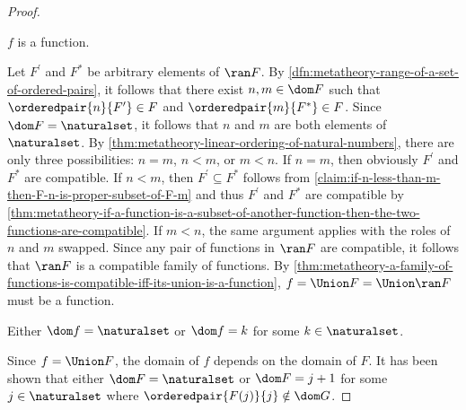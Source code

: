 \begin{proof}
    \begin{claim}
         \label{claim:f-is-a-function}
        \( f \) is a function.
    \end{claim}
    \noindent
    Let \( F^{\prime} \) and \( F^{\ast} \) be arbitrary elements of \( \ran F \).
    By \cref{dfn:metatheory-range-of-a-set-of-ordered-pairs}, it follows that there exist \( n, m \in \dom F\)
    such that \( \orderedpair{n}{F^{\prime}} \in F \) and \( \orderedpair{m}{F^{\ast}} \in F \).
    Since \( \dom F = \naturalset \), it follows that \( n \) and \( m \) are both elements of \( \naturalset \).
    By \cref{thm:metatheory-linear-ordering-of-natural-numbers}, there are only three possibilities: \( n = m \), \( n < m \), or \( m < n \).
    If \( n = m \), then obviously \( F^{\prime} \) and \( F^{\ast} \) are compatible.
    If \( n < m \), then  \( F^{\prime} \subseteq F^{\ast} \) follows from \cref{claim:if-n-less-than-m-then-F-n-is-proper-subset-of-F-m}
    and thus \( F^{\prime} \) and \( F^{\ast} \) are compatible by \cref{thm:metatheory-if-a-function-is-a-subset-of-another-function-then-the-two-functions-are-compatible}.
    If \( m < n \), the same argument applies with the roles of \( n \) and \( m \) swapped.
    Since any pair of functions in \( \ran F \) are compatible, it follows that \( \ran F \) is a compatible family of functions.
    By \cref{thm:metatheory-a-family-of-functions-is-compatible-iff-its-union-is-a-function}, \( f = \Union F = \Union \ran F \) must be a function.

    \begin{claim}
         \label{claim:domain-of-f-is-either-N-or-k-where-k-is-an-element-of-N}
        Either \( \dom f = \naturalset \) or \( \dom f = k \) for some \( k \in \naturalset \).
    \end{claim}
    \noindent
    Since \( f = \Union F \), the domain of \( f \) depends on the domain of \( F \).
    It has been shown that either \( \dom F = \naturalset \) or \( \dom F = j + 1 \) for some \( j \in \naturalset \) where \( \orderedpair{F(j)}{j} \notin \dom G \).


\end{proof}
